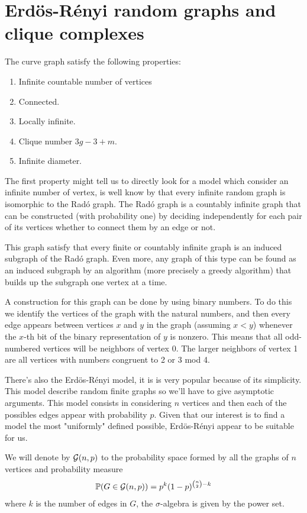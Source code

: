 \section{Erdös-Rényi random graphs and clique complexes}

The curve graph satisfy the following properties:

\begin{enumerate}
\item Infinite countable number of vertices
\item Connected.
\item Locally infinite.
\item Clique number $3g-3+m$.
\item Infinite diameter.
\end{enumerate}

The first property might tell us to directly look for a model which consider an infinite number of vertex, is well know by \cite[Erdös, Rényi]{RadoUnique} that every infinite random graph is isomorphic to the Radó graph. The Radó graph is a countably infinite graph that can be constructed (with probability one) by deciding independently for each pair of its vertices whether to connect them by an edge or not.

This graph satisfy that every finite or countably infinite graph is an induced subgraph of the Radó graph. Even more, any graph of this type can be found as an induced subgraph by an algorithm (more precisely a greedy algorithm) that builds up the subgraph one vertex at a time.

A construction for this graph can be done by using binary numbers. To do this we identify the vertices of the graph with the natural numbers, and then every edge appears between vertices $x$ and $y$ in the graph (assuming $x < y$) whenever the $x$-th bit of the binary representation of $y$ is nonzero. This means that all odd-numbered vertices will be neighbors of vertex 0. The larger neighbors of vertex 1 are all vertices with numbers congruent to 2 or 3 mod 4.

 There's also the Erdös-Rényi model, it is is very popular because of its simplicity. This model describe random finite graphs so we'll have to give asymptotic arguments. This model consists in considering $n$ vertices and then each of the possibles edges appear with probability $p$. Given that our interest is to find a model the most "uniformly" defined possible, Erdös-Rényi appear to be suitable for us. 

\begin{defini}
We will denote by $\mathcal{G}(n,p)$ to the probability space formed by all the graphs of $n$ vertices and probability measure 
$$ \mathbb{P}(G\in \mathcal{G}(n,p)) = p^{k} (1-p)^{\binom{n}{2}-k} $$
where $k$ is the number of edges in $G$, the $\sigma$-algebra is given by the power set.
\end{defini}

